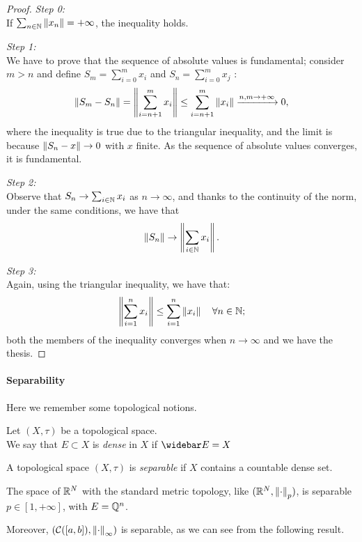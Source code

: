 \begin{proof}

	\textit{Step 0:}\\
	If $\sum_{n \in \mathbb N} \left\lVert x_n\right\rVert=+\infty$, the inequality holds.
	
	\textit{Step 1:}\\
	We have to prove that the sequence of absolute values is fundamental; consider $m > n$ and define 
	$S_m 
	= \sum_{i=0}^m x_i$ 
	and 
	$S_n 
	= \sum_{i=0}^m x_j$
	:
	$$
		\left\lVert S_m - S_n\right\rVert 
		= \left\lVert \sum_{i=n+1}^m x_i\right\rVert 
		\leq \sum^m_{i=n+1}\left\lVert x_i\right\rVert 
		\xrightarrow{n,m \to +\infty} 0
	,
	$$
	where the inequality is true due to the triangular inequality, and the limit is because $\left\lVert S_n -x \right\rVert \to 0$ with $x$ finite. As the sequence of absolute values converges, it is fundamental.
	
	\textit{Step 2:}\\
	Observe that $S_n \to \sum_{i \in \mathbb N} x_i$ as $n \to \infty$, and thanks to the continuity of the norm, under the same conditions, we have that 
	$$\left\lVert S_n\right\rVert 
	\to \left\lVert\sum_{i \in \mathbb N} x_i\right\rVert
	.
	$$
	
	\textit{Step 3:}\\
	Again, using the triangular inequality, we have that:
	$$
	\left\lVert\sum_{i=1}^n x_i\right\rVert 
	\leq \sum_{i=1}^n \left\lVert x_i\right\rVert
	\quad \forall n \in \mathbb N
	;
	$$
	both the members of the inequality converges when $n \to \infty$ and we have the thesis.
\end{proof}

\paragraph{Separability} Here we remember some topological notions.

\begin{defn}
	Let $(X,\tau)$ be a topological space.\\
	We say that $E\subset X$ is \emph{dense} in $X$ if $\widebar E = X$
\end{defn}

\begin{defn}
	A topological space $(X,\tau)$ is \emph{separable} if $X$ contains a countable dense set.
\end{defn} 

\begin{exam}
	The space of $\mathbb R^N$ with the standard metric topology, like $(\mathbb R^N, \left\lVert\cdot\right\rVert_p)$, is separable $p\in[1,+\infty]$, with $E=\mathbb Q^n$.
	
	Moreover, $(\mathcal C([a,b]),\left\lVert\cdot\right\rVert_\infty) $ is separable, as we can see from the following result.
\end{exam}

